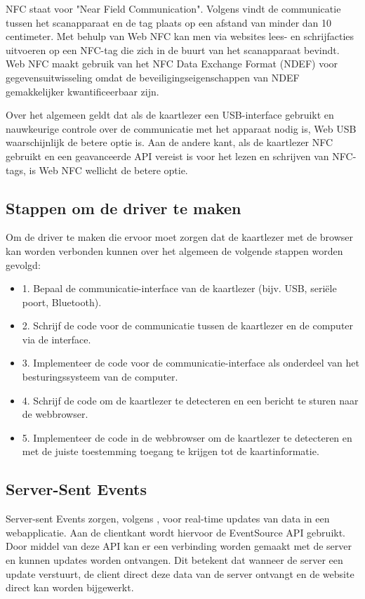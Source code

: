 NFC staat voor "Near Field Communication". Volgens \textcite{FrançoisBeaufortNFC} vindt de communicatie tussen het scanapparaat en de tag plaats op een afstand van minder dan 10 centimeter. Met behulp van Web NFC kan men via websites lees- en schrijfacties uitvoeren op een NFC-tag die zich in de buurt van het scanapparaat bevindt. Web NFC maakt gebruik van het NFC Data Exchange Format (NDEF) voor gegevensuitwisseling omdat de beveiligingseigenschappen van NDEF gemakkelijker kwantificeerbaar zijn.

Over het algemeen geldt dat als de kaartlezer een USB-interface gebruikt en nauwkeurige controle over de communicatie met het apparaat nodig is, Web USB waarschijnlijk de betere optie is. Aan de andere kant, als de kaartlezer NFC gebruikt en een geavanceerde API vereist is voor het lezen en schrijven van NFC-tags, is Web NFC wellicht de betere optie.

\subsection{Stappen om de driver te maken}
Om de driver te maken die ervoor moet zorgen dat de kaartlezer met de browser kan worden verbonden kunnen over het algemeen de volgende stappen worden gevolgd:
\begin{itemize}
    \item 1. Bepaal de communicatie-interface van de kaartlezer (bijv. USB, seriële poort, Bluetooth).
    \item 2. Schrijf de code voor de communicatie tussen de kaartlezer en de computer via de interface.
    \item 3. Implementeer de code voor de communicatie-interface als onderdeel van het besturingssysteem van de computer.
    \item 4. Schrijf de code om de kaartlezer te detecteren en een bericht te sturen naar de webbrowser.
    \item 5. Implementeer de code in de webbrowser om de kaartlezer te detecteren en met de juiste toestemming toegang te krijgen tot de kaartinformatie.
\end{itemize}

\subsection{Server-Sent Events}
Server-sent Events zorgen, volgens \textcite{DigitalOceanSSE}, voor real-time updates van data in een webapplicatie. Aan de clientkant wordt hiervoor de EventSource API gebruikt. Door middel van deze API kan er een verbinding worden gemaakt met de server en kunnen updates worden ontvangen. Dit betekent dat wanneer de server een update verstuurt, de client direct deze data van de server ontvangt en de website direct kan worden bijgewerkt.

